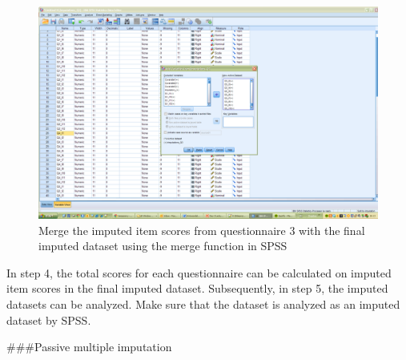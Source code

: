 \documentclass[
]{book}
\begin{document}
\begin{figure}

{\centering \includegraphics[width=0.9\linewidth]{images/fig8.9} 

}

\caption{Merge the imputed item scores from questionnaire 3 with the final imputed dataset using the merge function in SPSS}\label{fig:fig8-9}
\end{figure}

In step 4, the total scores for each questionnaire can be calculated on
imputed item scores in the final imputed dataset. Subsequently, in step
5, the imputed datasets can be analyzed. Make sure that the dataset is
analyzed as an imputed dataset by SPSS.

\#\#\#Passive multiple imputation
\end{document}
